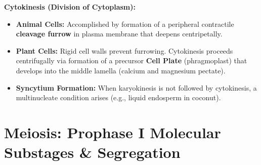 \documentclass[10pt,twoside,openright]{book}
\begin{document}
\begin{conceptbox}
\textbf{Cytokinesis (Division of Cytoplasm):}
\begin{itemize}
  \item \textbf{Animal Cells:} Accomplished by formation of a peripheral contractile \textbf{cleavage furrow} in plasma membrane that deepens centripetally.
  \item \textbf{Plant Cells:} Rigid cell walls prevent furrowing. Cytokinesis proceeds centrifugally via formation of a precursor \textbf{Cell Plate} (phragmoplast) that develops into the middle lamella (calcium and magnesium pectate).
  \item \textbf{Syncytium Formation:} When karyokinesis is not followed by cytokinesis, a multinucleate condition arises (e.g., liquid endosperm in coconut).
\end{itemize}
\end{conceptbox}

\section{Meiosis: Prophase I Molecular Substages \& Segregation}
\end{document}
